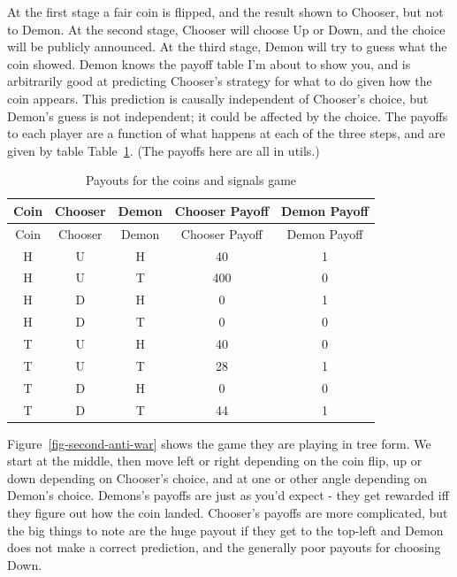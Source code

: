 \documentclass[
  12pt,
  letterpaper,
  DIV=11,
  numbers=noendperiod]{scrreprt}
\begin{document}
At the first stage a fair coin is flipped, and the result shown to
Chooser, but not to Demon. At the second stage, Chooser will choose Up
or Down, and the choice will be publicly announced. At the third stage,
Demon will try to guess what the coin showed. Demon knows the payoff
table I'm about to show you, and is arbitrarily good at predicting
Chooser's strategy for what to do given how the coin appears. This
prediction is causally independent of Chooser's choice, but Demon's
guess is not independent; it could be affected by the choice. The
payoffs to each player are a function of what happens at each of the
three steps, and are given by table Table~\ref{tbl-payoffs-demon-coin}.
(The payoffs here are all in utils.)

\begin{longtable}[]{@{}ccccc@{}}
\caption{Payouts for the coins and signals
game}\label{tbl-payoffs-demon-coin}\tabularnewline
\toprule\noalign{}
Coin & Chooser & Demon & Chooser Payoff & Demon Payoff \\
\midrule\noalign{}
\endfirsthead
\toprule\noalign{}
Coin & Chooser & Demon & Chooser Payoff & Demon Payoff \\
\midrule\noalign{}
\endhead
\bottomrule\noalign{}
\endlastfoot
H & U & H & 40 & 1 \\
H & U & T & 400 & 0 \\
H & D & H & 0 & 1 \\
H & D & T & 0 & 0 \\
T & U & H & 40 & 0 \\
T & U & T & 28 & 1 \\
T & D & H & 0 & 0 \\
T & D & T & 44 & 1 \\
\end{longtable}

Figure~\ref{fig-second-anti-war} shows the game they are playing in tree
form. We start at the middle, then move left or right depending on the
coin flip, up or down depending on Chooser's choice, and at one or other
angle depending on Demon's choice. Demons's payoffs are just as you'd
expect - they get rewarded iff they figure out how the coin landed.
Chooser's payoffs are more complicated, but the big things to note are
the huge payout if they get to the top-left and Demon does not make a
correct prediction, and the generally poor payouts for choosing Down.
\end{document}
